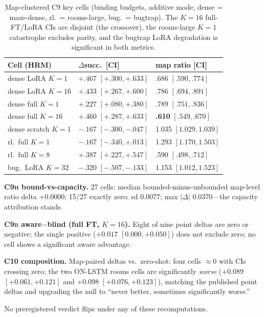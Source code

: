 \documentclass[letterpaper]{article} %
\newcommand{\stage}[1]{\textsc{#1}}
\begin{document}
\begin{table}[t]
\centering
\small
\setlength{\tabcolsep}{1.5pt}
\begin{tabular}{@{}lll@{}}
\toprule
Cell (HRM) & $\Delta$succ.\ [CI] & map ratio [CI] \\
\midrule
dense LoRA $K{=}1$ & $+.467$ $[+.300,+.633]$ & .686 $[.590,.774]$ \\
dense LoRA $K{=}16$ & $+.433$ $[+.267,+.600]$ & .786 $[.694,.891]$ \\
dense full $K{=}1$ & $+.227$ $[+.080,+.380]$ & .789 $[.751,.836]$ \\
dense full $K{=}16$ & $+.460$ $[+.287,+.633]$ & \textbf{.610} $[.549,.670]$ \\
dense scratch $K{=}1$ & $-.167$ $[-.300,-.047]$ & 1.035 $[1.029,1.039]$ \\
rl.\ full $K{=}1$ & $-.167$ $[-.340,+.013]$ & 1.293 $[1.170,1.503]$ \\
rl.\ full $K{=}8$ & $+.387$ $[+.227,+.547]$ & .590 $[.498,.712]$ \\
bug.\ LoRA $K{=}32$ & $-.320$ $[-.507,-.133]$ & 1.153 $[1.012,1.523]$ \\
\bottomrule
\end{tabular}
\caption{Map-clustered \stage{C9} key cells (binding budgets, additive mode; dense = maze-dense, rl.\ = rooms-large, bug.\ = bugtrap). The $K{=}16$ full-FT/LoRA CIs are disjoint (the crossover), the rooms-large $K{=}1$ catastrophe excludes parity, and the bugtrap LoRA degradation is significant in both metrics.}
\label{tab:wcr-c9}
\end{table}

\textbf{\stage{C9h} bound-vs-capacity.} 27 cells: median bounded-minus-unbounded map-level ratio delta $+0.0000$; 15/27 exactly zero; sd 0.0077; max $|\Delta|$ 0.0370---the capacity attribution stands.

\textbf{\stage{C9b} aware$-$blind (full FT, $K{=}16$).} Eight of nine point deltas are zero or negative; the single positive ($+0.017$ $[0.000,+0.050]$) does not exclude zero; no cell shows a significant aware advantage.

\textbf{\stage{C10} composition.} Map-paired deltas vs.\ zero-shot: four cells $\approx$0 with CIs crossing zero; the two ON-LSTM rooms cells are significantly \emph{worse} ($+0.089$ $[+0.061,+0.121]$ and $+0.098$ $[+0.076,+0.123]$), matching the published point deltas and upgrading the null to ``never better, sometimes significantly worse.''

No preregistered verdict flips under any of these recomputations.
\end{document}
